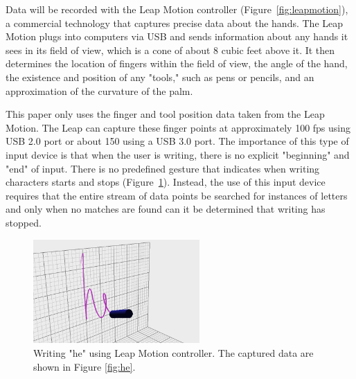 
Data will be recorded with the Leap Motion controller (Figure~\ref{fig:leapmotion}), a commercial technology that captures precise data about the hands.
The Leap Motion plugs into computers via USB and sends information about any hands it sees in its field of view, which is a cone of about 8 cubic feet above it.
It then determines the location of fingers within the field of view, the angle of the hand, the existence and position of any "tools," such as pens or pencils, and an approximation of the curvature of the palm.

This paper only uses the finger and tool position data taken from the Leap Motion. The Leap can capture these finger points at approximately 100 fps using USB 2.0 port or about 150 using a USB 3.0 port.
The importance of this type of input device is that when the user is writing, there is no explicit "beginning" and "end" of input. There is no predefined gesture that indicates when writing characters starts and stops (Figure~\ref{fig:writing-he}). Instead, the use of this input device requires that the entire stream of data points be searched for instances of letters and only when no matches are found can it be determined that writing has stopped.

\begin{figure}
\centering
  \includegraphics[width=2.5in]{images/he-white.PNG}
  \caption{Writing "he" using Leap Motion controller. The captured data are shown in Figure \ref{fig:he}.}
  \label{fig:writing-he}
\end{figure}
